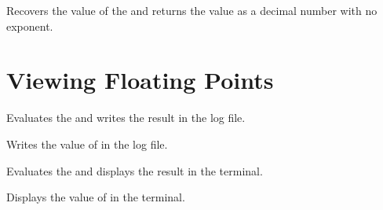 \documentclass[oneside]{book}
\begin{document}
\begin{function}{\FpUse}
\begin{syntax}
 
\end{syntax}
Recovers the value of the  and returns the value as a
decimal number with no exponent.
\end{function}

\section{Viewing Floating Points}

\begin{function}{\FpLog}
\begin{syntax}
 
\end{syntax}
Evaluates the  and writes the
result in the log file.
\end{function}

\begin{function}{\FpVarLog}
\begin{syntax}
 
\end{syntax}
Writes the value of  in the log file.
\end{function}

\begin{function}{\FpShow}
\begin{syntax}
 
\end{syntax}
Evaluates the  and displays the
result in the terminal.
\end{function}

\begin{function}{\FpVarShow}
\begin{syntax}
 
\end{syntax}
Displays the value of  in the terminal.
\end{function}
\end{document}
